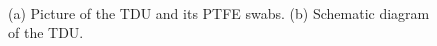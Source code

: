 \begin{figure}
  \\
  \caption{(a) Picture of the TDU and its PTFE swabs. (b) Schematic diagram of the TDU.}\label{fig:tdu}
\end{figure}








